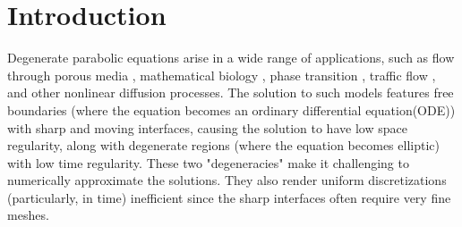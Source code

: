 \documentclass[review,11pt]{article}
\numberwithin{equation}{section}
\begin{document}
\begin{abstract}
\end{abstract}
\section{Introduction} \label{introduction}
Degenerate parabolic equations arise in a wide range of applications, such as flow through porous media \cite{vazquez2007porous}, mathematical biology \cite{van2002mathematical}, phase transition \cite{Malgo}, traffic flow \cite{berthelin2008model}, and other nonlinear diffusion processes. 
The solution to such models features free boundaries (where the equation becomes an ordinary differential equation(ODE)) with sharp and moving interfaces, causing the solution to have low space regularity, along with degenerate regions (where the equation becomes elliptic) with low time regularity. These two "degeneracies" make it challenging to numerically approximate the solutions. They also render uniform discretizations (particularly, in time) inefficient since the sharp interfaces often require very fine meshes.
\end{document}
